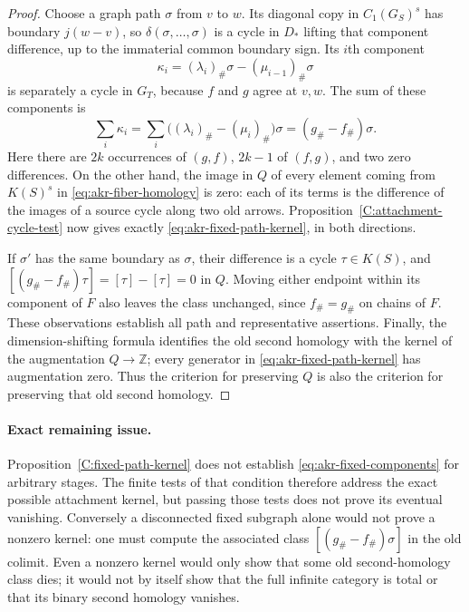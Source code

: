 \begin{proof}
Choose a graph path $\sigma$ from $v$ to $w$. Its diagonal copy in
$C_1(G_S)^s$ has boundary $j(w-v)$, so
$\delta(\sigma,\ldots,\sigma)$ is a cycle in $D_*$ lifting that
component difference, up to the immaterial common boundary sign.
Its $i$th component
\[
 \kappa_i=(\lambda_i)_\#\sigma-(\mu_{i-1})_\#\sigma
\]
is separately a cycle in $G_T$, because $f$ and $g$ agree at $v,w$.
The sum of these components is
\[
 \sum_i\kappa_i
 =\sum_i\bigl((\lambda_i)_\#-(\mu_i)_\#\bigr)\sigma
 =(g_\#-f_\#)\sigma.
\]
Here there are $2k$ occurrences of $(g,f)$, $2k-1$ of $(f,g)$,
and two zero differences. On the other hand, the image in $Q$ of
every element coming from $K(S)^s$ in
\eqref{eq:akr-fiber-homology} is zero: each of its terms is the
difference of the images of a source cycle along two old arrows.
Proposition~\ref{C:attachment-cycle-test} now gives exactly
\eqref{eq:akr-fixed-path-kernel}, in both directions.

If $\sigma'$ has the same boundary as $\sigma$, their difference is
a cycle $\tau\in K(S)$, and
$[(g_\#-f_\#)\tau]=[\tau]-[\tau]=0$ in $Q$. Moving either endpoint
within its component of $F$ also leaves the class unchanged, since
$f_\#=g_\#$ on chains of $F$. These observations establish all path
and representative assertions. Finally, the dimension-shifting
formula identifies the old second homology with the kernel of the
augmentation $Q\to\mathbb Z$; every generator in
\eqref{eq:akr-fixed-path-kernel} has augmentation zero. Thus the
criterion for preserving $Q$ is also the criterion for preserving
that old second homology.
\end{proof}

\paragraph{Exact remaining issue.}
Proposition~\ref{C:fixed-path-kernel} does not establish
\eqref{eq:akr-fixed-components} for arbitrary stages. The finite tests
of that condition therefore address the exact possible attachment
kernel, but passing those tests does not prove its eventual
vanishing. Conversely a disconnected fixed subgraph alone would not
prove a nonzero kernel: one must compute the associated class
$[(g_\#-f_\#)\sigma]$ in the old colimit. Even a nonzero kernel would
only show that some old second-homology class dies; it would not by
itself show that the full infinite category is total or that its
binary second homology vanishes.
